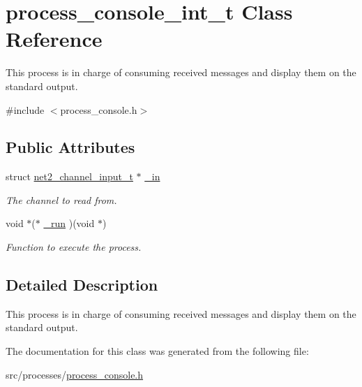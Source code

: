 \hypertarget{structprocess__console__int__t}{\section{process\-\_\-console\-\_\-int\-\_\-t Class Reference}
\label{structprocess__console__int__t}
}


This process is in charge of consuming received messages and display them on the standard output.  




{\ttfamily \#include $<$process\-\_\-console.\-h$>$}

\subsection*{Public Attributes}
\begin{DoxyCompactItemize}
\item 
\hypertarget{structprocess__console__int__t_a2b11271b3a29fed457b30fd477873daf}{struct \hyperlink{structnet2__channel__input__t}{net2\-\_\-channel\-\_\-input\-\_\-t} $\ast$ \hyperlink{structprocess__console__int__t_a2b11271b3a29fed457b30fd477873daf}{\-\_\-in}}\label{structprocess__console__int__t_a2b11271b3a29fed457b30fd477873daf}

\begin{DoxyCompactList}\small\item\em The channel to read from. \end{DoxyCompactList}\item 
\hypertarget{structprocess__console__int__t_ae2348efd72d818e7521fc8e630e69e70}{void $\ast$($\ast$ \hyperlink{structprocess__console__int__t_ae2348efd72d818e7521fc8e630e69e70}{\-\_\-run} )(void $\ast$)}\label{structprocess__console__int__t_ae2348efd72d818e7521fc8e630e69e70}

\begin{DoxyCompactList}\small\item\em Function to execute the process. \end{DoxyCompactList}\end{DoxyCompactItemize}


\subsection{Detailed Description}
This process is in charge of consuming received messages and display them on the standard output. 

The documentation for this class was generated from the following file\-:\begin{DoxyCompactItemize}
\item 
src/processes/\hyperlink{process__console_8h}{process\-\_\-console.\-h}\end{DoxyCompactItemize}

